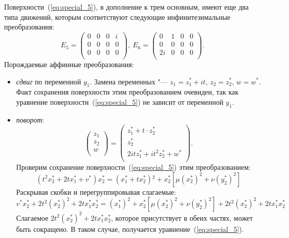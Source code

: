 \documentclass[../main.tex]{subfiles}
\begin{document}
Поверхности~(\ref{eq:special_5}), в дополнение к трем основным, имеют еще два типа движений, которым соответствуют следующие инфинитезимальные преобразования:
\begin{equation*}
E_5 = \left(
\begin{array}{cccc}
 0 & 0 & 0 & i \\
 0 & 0 & 0 & 0 \\
 0 & 0 & 0 & 0 \\
\end{array}
\right),~
E_6 = \left(
\begin{array}{cccc}
 0 & 1 & 0 & 0 \\
 0 & 0 & 0 & 0 \\
 2i & 0 & 0 & 0 \\
\end{array}
\right).
\end{equation*}
Порождаемые аффинные преобразования:
\begin{itemize}
\item \textit{сдвиг} по переменной $y_1$. Замена переменных "--- $z_1 = z_1^* + i t$, $z_2 = z_2^*$, $w = w^*$. Факт сохранения поверхности этим преобразованием очевиден, так как уравнение поверхности~(\ref{eq:special_5}) не зависит от переменной $y_1$.

\item \textit{поворот}:
\begin{equation*}
\left(
\begin{array}{c}
 z_1 \\
 z_2 \\
 w \\
\end{array}
\right) = 
\left(
\begin{array}{c}
 z_1^* + t \cdot z_2^* \\
 z_2^*\\
 2 i t z_1^* + i t^2 z_2^* + w^*\\
\end{array}
\right).
\end{equation*}
Проверим сохранение поверхности~(\ref{eq:special_5}) этим преобразованием:
\begin{equation*}
\left(t^2 x_2^* +2 t x_1^* + v^*\right) x_2^* = \left(x_1^* + t x_2^*\right){}^2 + x_2^* \left[\mu  (x_2^*)^2+\nu  (y_2^*)^2\right]
\end{equation*}
Раскрывая скобки и перегруппировывая слагаемые:
\begin{equation*}
v^* x_2^* + 2 t^2 (x_2^*)^2 + 2 t x_1^* x_2^* = (x_1^*)^2 + x_2^* \left[\mu  (x_2^*)^2+\nu  (y_2^*)^2\right]+ 2t^2 (x_2^*)^2 + 2 t x_1^* x_2^* 
\end{equation*}
Слагаемое $2t^2 (x_2^*)^2 + 2 t x_1^* x_2^*$, которое присутствует в обеих частях, может быть сокращено. В таком случае, получается уравнение~(\ref{eq:special_5}).
\end{itemize}
\end{document}
